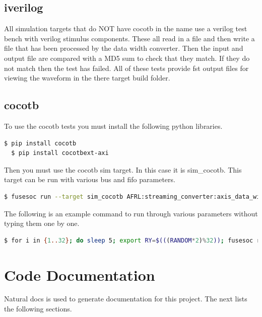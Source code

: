 \subsection{iverilog}
\par
All simulation targets that do NOT have cocotb in the name use a verilog test bench with verilog stimulus components. These all read in a file
and then write a file that has been processed by the data width converter. Then the input and output file are compared with a MD5 sum to check that they
match. If they do not match then the test has failed. All of these tests provide fst output files for viewing the waveform in the there
target build folder.

\subsection{cocotb}
\par
To use the cocotb tests you must install the following python libraries.
\begin{lstlisting}[language=bash]
  $ pip install cocotb
  $ pip install cocotbext-axi
\end{lstlisting}

Then you must use the cocotb sim target. In this case it is sim\_cocotb. This target can be run with various bus and fifo parameters.
\begin{lstlisting}[language=bash]
  $ fusesoc run --target sim_cocotb AFRL:streaming_converter:axis_data_width_converter:1.0.1 --SLAVE_WIDTH=8 --MASTER_WIDTH=32
\end{lstlisting}

The following is an example command to run through various parameters without typing them one by one.
\begin{lstlisting}[language=bash]
  $ for i in {1..32}; do sleep 5; export RY=$(((RANDOM*2)%32)); fusesoc run --target sim_cocotb AFRL:streaming_converter:axis_data_width_converter:1.0.1 --SLAVE_WIDTH=$i --MASTER_WIDTH=$RY; echo "SLAVE WIDTH:" $i "MASTER WIDTH:" $RY; done
\end{lstlisting}
\newpage

\section{Code Documentation} \label{Code Documentation}

\par
Natural docs is used to generate documentation for this project. The next lists the following sections.

